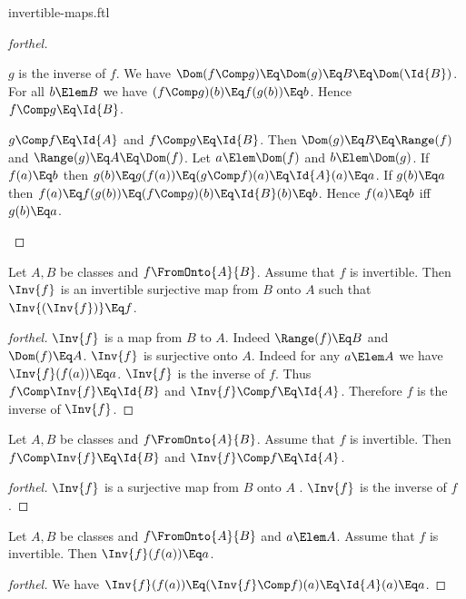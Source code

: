 \documentclass{stex}
\begin{document}
\begin{smodule}{invertible-maps.ftl}
\begin{proof}[forthel]
\begin{case}{$g$ is the inverse of $f$.}
    We have
    $\Dom(f \Comp g)
      \Eq \Dom(g)
      \Eq B
      \Eq \Dom(\Id{B})$.
    For all $b \Elem B$ we have
    $(f \Comp g)(b)
      \Eq f(g(b))
      \Eq b$.
    Hence $f \Comp g \Eq \Id{B}$.
  \end{case}

  \begin{case}{$g \Comp f \Eq \Id{A}$ and $f \Comp g \Eq \Id{B}$.}
    Then $\Dom(g)
      \Eq B
      \Eq \Range(f)$
    and $\Range(g)
      \Eq A
      \Eq \Dom(f)$.
    Let $a \Elem \Dom(f)$ and $b \Elem \Dom(g)$.
    If $f(a) \Eq b$ then
    $g(b)
      \Eq g(f(a))
      \Eq (g \Comp f)(a)
      \Eq \Id{A}(a)
      \Eq a$.
    If $g(b) \Eq a$ then
    $f(a)
      \Eq f(g(b))
      \Eq (f \Comp g)(b)
      \Eq \Id{B}(b)
      \Eq b$.
    Hence $f(a) \Eq b$ iff $g(b) \Eq a$.
  \end{case}
\end{proof}

\begin{proposition*}[forthel]
  Let $A, B$ be classes and $f \FromOnto{A}{B}$.
  Assume that $f$ is invertible.
  Then $\Inv{f}$ is an invertible surjective map from $B$ onto $A$ such that $\Inv{(\Inv{f})} \Eq f$.
\end{proposition*}
\begin{proof}[forthel]
  $\Inv{f}$ is a map from $B$ to $A$.
  Indeed $\Range(f) \Eq B$ and $\Dom(f) \Eq A$.
  $\Inv{f}$ is surjective onto $A$.
  Indeed for any $a \Elem A$ we have $\Inv{f}(f(a)) \Eq a$.
  $\Inv{f}$ is the inverse of $f$.
  Thus $f \Comp \Inv{f} \Eq \Id{B}$ and $\Inv{f} \Comp f \Eq \Id{A}$.
  Therefore $f$ is the inverse of $\Inv{f}$.
\end{proof}

\begin{proposition*}[forthel]
  Let $A, B$ be classes and $f \FromOnto{A}{B}$.
  Assume that $f$ is invertible.
  Then $f \Comp \Inv{f} \Eq \Id{B}$ and $\Inv{f} \Comp f \Eq \Id{A}$.
\end{proposition*}
\begin{proof}[forthel]
  $\Inv{f}$ is a surjective map from $B$ onto $A$ .
  $\Inv{f}$ is the inverse of $f$.
\end{proof}

\begin{proposition*}[forthel]
  Let $A, B$ be classes and $f \FromOnto{A}{B}$ and $a \Elem A$.
  Assume that $f$ is invertible.
  Then $\Inv{f}(f(a)) \Eq a$.
\end{proposition*}
\begin{proof}[forthel]
  We have $\Inv{f}(f(a)) \Eq (\Inv{f} \Comp f)(a) \Eq \Id{A}(a) \Eq a$.
\end{proof}


\end{smodule}
\end{document}
